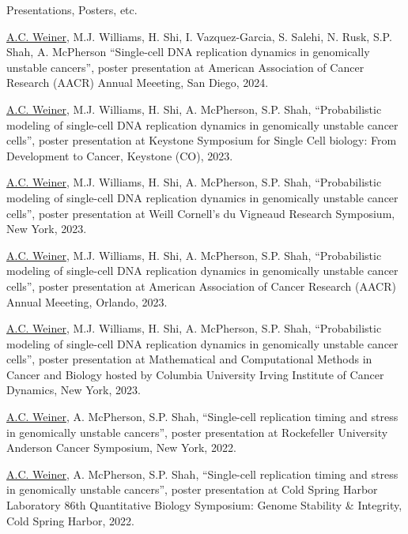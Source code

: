 \documentclass{resume} %
\begin{document}

\begin{rSection}{Presentations, Posters, etc.}

\underline{A.C. Weiner}, M.J. Williams, H. Shi, I. Vazquez-Garcia, S. Salehi, N. Rusk, S.P. Shah, A. McPherson ``Single-cell DNA replication dynamics in genomically unstable cancers'', poster presentation at American Association of Cancer Research (AACR) Annual Meeeting, San Diego, 2024.

\underline{A.C. Weiner}, M.J. Williams, H. Shi, A. McPherson, S.P. Shah, ``Probabilistic modeling of single-cell DNA replication dynamics in genomically unstable cancer cells'', poster presentation at Keystone Symposium for Single Cell biology: From Development to Cancer, Keystone (CO), 2023.

\underline{A.C. Weiner}, M.J. Williams, H. Shi, A. McPherson, S.P. Shah, ``Probabilistic modeling of single-cell DNA replication dynamics in genomically unstable cancer cells'', poster presentation at Weill Cornell's du Vigneaud Research Symposium, New York, 2023.

\underline{A.C. Weiner}, M.J. Williams, H. Shi, A. McPherson, S.P. Shah, ``Probabilistic modeling of single-cell DNA replication dynamics in genomically unstable cancer cells'', poster presentation at American Association of Cancer Research (AACR) Annual Meeeting, Orlando, 2023.

\underline{A.C. Weiner}, M.J. Williams, H. Shi, A. McPherson, S.P. Shah, ``Probabilistic modeling of single-cell DNA replication dynamics in genomically unstable cancer cells'', poster presentation at Mathematical and Computational Methods in Cancer and Biology hosted by Columbia University Irving Institute of Cancer Dynamics, New York, 2023.

\underline{A.C. Weiner}, A. McPherson, S.P. Shah, ``Single-cell replication timing and stress in genomically unstable cancers'', poster presentation at Rockefeller University Anderson Cancer Symposium, New York, 2022.

\underline{A.C. Weiner}, A. McPherson, S.P. Shah, ``Single-cell replication timing and stress in genomically unstable cancers'', poster presentation at Cold Spring Harbor Laboratory 86th Quantitative Biology Symposium: Genome Stability \& Integrity, Cold Spring Harbor, 2022.


\end{rSection}
\end{document}
